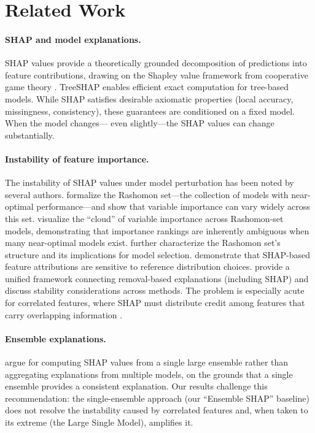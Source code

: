 \documentclass[11pt]{article}
\begin{document}
\section{Related Work}
\label{sec:related}

\paragraph{SHAP and model explanations.}
SHAP values \citep{lundberg2017unified} provide a theoretically grounded
decomposition of predictions into feature contributions, drawing on the
Shapley value framework from cooperative game theory
\citep{shapley1953value}. TreeSHAP \citep{lundberg2020local} enables
efficient exact computation for tree-based models. While SHAP satisfies
desirable axiomatic properties (local accuracy, missingness, consistency),
these guarantees are conditioned on a fixed model. When the model changes---
even slightly---the SHAP values can change substantially.

\paragraph{Instability of feature importance.}
The instability of SHAP values under model perturbation has been noted by
several authors. \citet{fisher2019all} formalize the Rashomon set---the
collection of models with near-optimal performance---and show that
variable importance can vary widely across this set.
\citet{dong2020exploring} visualize the ``cloud'' of variable importance
across Rashomon-set models, demonstrating that importance rankings are
inherently ambiguous when many near-optimal models exist.
\citet{semenova2022existence} further characterize the Rashomon set's
structure and its implications for model selection.
\citet{marx2023but} demonstrate that SHAP-based feature attributions
are sensitive to reference distribution choices.
\citet{covert2021explaining} provide a unified framework connecting
removal-based explanations (including SHAP) and discuss stability
considerations across methods.
The problem is especially acute for correlated features, where SHAP must
distribute credit among features that carry overlapping information
\citep{kumar2020problems, chen2020true}.

\paragraph{Ensemble explanations.}
\citet{paillard2025ensemble} argue for computing SHAP values from a single
large ensemble rather than aggregating explanations from multiple models,
on the grounds that a single ensemble provides a consistent explanation.
Our results challenge this recommendation: the single-ensemble approach
(our ``Ensemble SHAP'' baseline) does not resolve the instability caused
by correlated features and, when taken to its extreme (the Large Single
Model), amplifies it.
\end{document}
